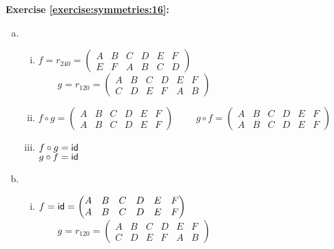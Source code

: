 \noindent\textbf{Exercise \ref{exercise:symmetries:16}:}
\begin{enumerate}[(a)]
\item
	\begin{enumerate}[(i)]
	\item
	$f=r_{240}=\begin{pmatrix}
	A & B & C & D & E & F\\
	E & F & A & B & C & D
	\end{pmatrix}$
	$\qquad g=r_{120}=\begin{pmatrix}
	A & B & C & D & E & F\\
	C & D & E & F & A & B
	\end{pmatrix}$\\
	
	\item
	$f\circ g=\begin{pmatrix}
	A & B & C & D & E & F\\
	A & B & C & D & E & F
	\end{pmatrix}$
	$\qquad g\circ f=\begin{pmatrix}
	A & B & C & D & E & F\\
	A & B & C & D & E & F
	\end{pmatrix}$
	
	\item
	$f\circ g = \sf{id}$\\
	$g\circ f= \sf{id}$
	\end{enumerate}
	
\item
	\begin{enumerate}[(i)]
	\item
	$f=\sf{id}=\begin{pmatrix}
	A & B & C & D & E & F\\
	A & B & C & D & E & F
	\end{pmatrix}$
	$\qquad g=r_{120}=\begin{pmatrix}
	A & B & C & D & E & F\\
	C & D & E & F & A & B
	\end{pmatrix}$\\
	

\end{enumerate}
\end{enumerate}
